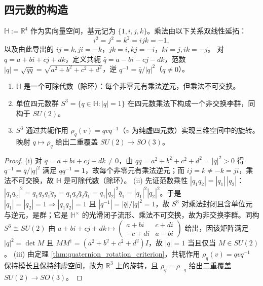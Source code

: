 \subsection{\texorpdfstring{四元数的构造}{四元数的构造}}

\begin{definition}[四元数的构造]\label{def:quaternion_construction}
$\mathbb{H} := \mathbb{R}^4$ 作为实向量空间，基元记为 $\{1,i,j,k\}$。乘法由以下关系双线性延拓：
\[
i^2 = j^2 = k^2 = ijk = -1,
\]
以及由此导出的 $ij = k, ji = -k$，$jk = i, kj = -i$，$ki = j, ik = -j$。
对 $q = a + bi + cj + dk$，定义共轭 $\bar{q} = a - bi - cj - dk$，范数 $|q| = \sqrt{q\bar{q}} = \sqrt{a^2+b^2+c^2+d^2}$，逆 $q^{-1} = \bar{q}/|q|^2$（$q \neq 0$）。
\end{definition}

\begin{proposition}[四元数的代数性质]\label{prop:quaternion_properties}
\begin{enumerate}[label=(\roman*)]
    \item $\mathbb{H}$ 是一个可除代数（除环）：每个非零元有乘法逆元，但乘法不可交换。
    \item 单位四元数群 $S^3 = \{q \in \mathbb{H} : |q| = 1\}$ 在四元数乘法下构成一个非交换李群，同构于 $SU(2)$。
    \item $S^3$ 通过共轭作用 $\rho_q(v) = q v q^{-1}$（$v$ 为纯虚四元数）实现三维空间中的旋转。映射 $q \mapsto \rho_q$ 给出二重覆盖 $SU(2) \to SO(3)$。
\end{enumerate}
\end{proposition}

\begin{proof}
(i) 对 $q = a + bi + cj + dk \neq 0$，由 $q\bar{q} = a^2+b^2+c^2+d^2 = |q|^2 > 0$ 得 $q^{-1} = \bar{q}/|q|^2$ 满足 $q q^{-1} = 1$，故每个非零元有乘法逆元；而 $ij = k \neq -k = ji$，乘法不可交换，故 $\mathbb{H}$ 是可除代数（除环）。
(ii) 先证范数乘性 $|q_1 q_2| = |q_1|\,|q_2|$：$|q_1 q_2|^2 = q_1 q_2 \overline{q_1 q_2} = q_1 q_2 \bar{q}_2 \bar{q}_1 = q_1 |q_2|^2 \bar{q}_1 = |q_1|^2 |q_2|^2$。于是 $|q_1|=|q_2|=1 \Rightarrow |q_1 q_2|=1$ 且 $|q^{-1}| = |\bar{q}|/|q|^2 = 1$，故 $S^3$ 对乘法封闭且含单位元与逆元，是群；它是 $\mathbb{H}^\times$ 的光滑闭子流形、乘法不可交换，故为非交换李群。同构 $S^3 \cong SU(2)$ 由 $a+bi+cj+dk \mapsto \begin{pmatrix} a+bi & c+di \\ -c+di & a-bi \end{pmatrix}$ 给出，因该矩阵满足 $|q|^2 = \det M$ 且 $M M^\dagger = (a^2+b^2+c^2+d^2)I$，故 $|q|=1$ 当且仅当 $M \in SU(2)$。
(iii) 由定理 \ref{thm:quaternion_rotation_criterion}，共轭作用 $\rho_q(v) = q v q^{-1}$ 保持模长且保持纯虚空间，故为 $\mathbb{R}^3$ 上的旋转，且 $\rho_q = \rho_{-q}$ 给出二重覆盖 $SU(2) \to SO(3)$。
\end{proof}

